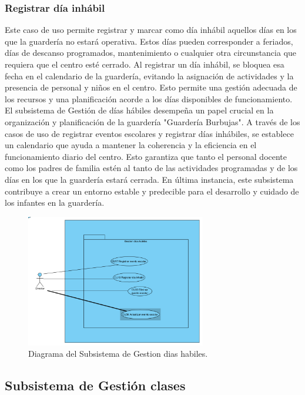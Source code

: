 \subsubsection{Registrar día inhábil}
Este caso de uso permite registrar y marcar como día inhábil aquellos días en los que la guardería no estará operativa. Estos días pueden corresponder a feriados, días de descanso programados, mantenimiento o cualquier otra circunstancia que requiera que el centro esté cerrado. Al registrar un día inhábil, se bloquea esa fecha en el calendario de la guardería, evitando la asignación de actividades y la presencia de personal y niños en el centro. Esto permite una gestión adecuada de los recursos y una planificación acorde a los días disponibles de funcionamiento.
\\
El subsistema de Gestión de días hábiles desempeña un papel crucial en la organización y planificación de la guardería "Guardería Burbujas". A través de los casos de uso de registrar eventos escolares y registrar días inhábiles, se establece un calendario que ayuda a mantener la coherencia y la eficiencia en el funcionamiento diario del centro. Esto garantiza que tanto el personal docente como los padres de familia estén al tanto de las actividades programadas y de los días en los que la guardería estará cerrada. En última instancia, este subsistema contribuye a crear un entorno estable y predecible para el desarrollo y cuidado de los infantes en la guardería.


\begin{figure}[htbp]
\centering
\includegraphics[width=0.7\textwidth]{images/arqui/subSisGestdias.png}
\caption{Diagrama del Subsistema de Gestion dias habiles.}
\label{fig:subsistGestiondias}
\end{figure}
\clearpage
\subsection{Subsistema de Gestión clases}

